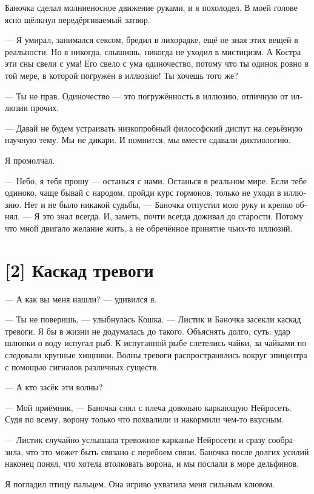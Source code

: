 \documentclass[a4paper,12pt,fleqn]{book}\usepackage{polyglossia}\setdefaultlanguage[babelshorthands=true]{russian}\setotherlanguage{english}\defaultfontfeatures{Ligatures=TeX,Mapping=tex-text}\usepackage{xcolor}\newcommand{\ml}[3]{#2}
\begin{document}
{Баночка сделал молниеносное движение руками, и я похолодел.
В моей голове ясно щёлкнул передёргиваемый затвор.

--- Я умирал, занимался сексом, бредил в лихорадке, ещё не зная этих вещей в реальности.
Но я никогда, слышишь, никогда не уходил в мистицизм.
А Костра эти сны свели с ума!
Его свело с ума одиночество, потому что ты одинок ровно в той мере, в которой погружён в иллюзию!
Ты хочешь того же?

--- Ты не прав.
Одиночество --- это погружённость в иллюзию, отличную от иллюзии прочих.

--- Давай не будем устраивать низкопробный философский диспут на серьёзную научную тему.
Мы не дикари.
И помнится, мы вместе сдавали диктиологию.

Я промолчал.

--- Небо, я тебя прошу --- останься с нами.
Останься в реальном мире.
Если тебе одиноко, чаще бывай с народом, пройди курс гормонов, только не уходи в иллюзию.
Нет и не было никакой судьбы, --- Баночка отпустил мою руку и крепко обнял.
--- Я это знал всегда.
И, заметь, почти всегда доживал до старости.
Потому что мной двигало желание жить, а не обречённое принятие чьих-то иллюзий.

\section{[2] Каскад тревоги}

--- А как вы меня нашли? --- удивился я.

--- Ты не поверишь, --- улыбнулась Кошка.
--- Листик и Баночка засекли каскад тревоги.
Я бы в жизни не додумалась до такого.
Объяснять долго, суть: удар шлюпки о воду испугал рыб.
К испуганной рыбе слетелись чайки, за чайками последовали крупные хищники.
Волны тревоги распространялись вокруг эпицентра с помощью сигналов различных существ.

--- А кто засёк эти волны?

--- Мой приёмник, --- Баночка снял с плеча довольно каркающую Нейросеть.
Судя по всему, ворону только что похвалили и накормили чем-то вкусным.

--- Листик случайно услышала тревожное карканье Нейросети и сразу сообразила, что это может быть связано с перебоем связи.
Баночка после долгих усилий наконец понял, что хотела втолковать ворона, и мы послали в море дельфинов.

Я погладил птицу пальцем.
Она игриво ухватила меня сильным клювом.

}
\end{document}
